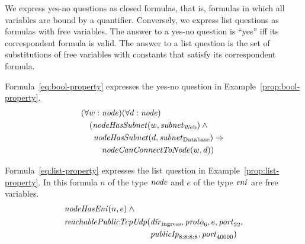 We express yes-no questions as closed formulas, that is, formulas in which all variables are bound by a quantifier. Conversely, we express list questions as formulas with free variables. The answer to a yes-no question is ``yes'' iff its correspondent formula is valid. The answer to a list question is the set of substitutions of free variables with constants that satisfy its correspondent formula.

Formula~\ref{eq:bool-property} expresses the yes-no question in Example~\ref{prop:bool-property}.
\begin{equation}\label{eq:bool-property}
\begin{aligned}
&(\forall w:\mathit{node})(\forall d:\mathit{node})\\
&\quad(\mathit{nodeHasSubnet}(w, \mathit{subnet}_\text{Web})\:\wedge\:\\
&\quad\,\,\,\mathit{nodeHasSubnet}(d, \mathit{subnet}_\text{Database}) \Rightarrow~\\
&\quad\,\,\,\quad\mathit{nodeCanConnectToNode}(w,d))
\end{aligned}
\end{equation}


Formula~\ref{eq:list-property} expresses the list question in Example~\ref{prop:list-property}. In this formula $n$ of the type $\mathit{node}$ and $e$ of the type $\mathit{eni}$ are free variables.
\begin{equation}\label{eq:list-property}
\begin{aligned}
&\mathit{nodeHasEni}(n,e)\:\wedge~\\
&\begin{aligned}
   \mathit{reachablePublicTcpUdp}(&\mathit{dir}_\text{ingress}, \mathit{proto}_6, e, \mathit{port}_{22},\\
                                &\mathit{publicIp}_\text{8:8:8:8}, \mathit{port}_\text{40000})
 \end{aligned}
\end{aligned}
\end{equation}

